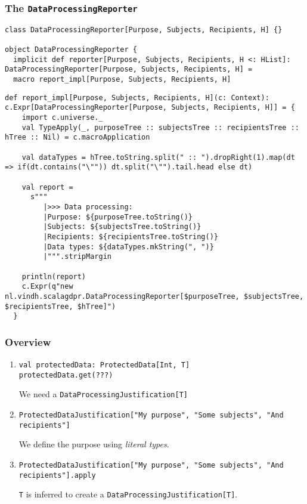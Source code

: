 \documentclass[aspectratio=169]{beamer}
\begin{document}
\begin{frame}[fragile]
\frametitle{The \texttt{DataProcessingReporter}}

\begin{lstlisting}[style=myScalastyle,frame=none]
class DataProcessingReporter[Purpose, Subjects, Recipients, H] {}

object DataProcessingReporter {
  implicit def reporter[Purpose, Subjects, Recipients, H <: HList]: DataProcessingReporter[Purpose, Subjects, Recipients, H] =
  macro report_impl[Purpose, Subjects, Recipients, H]
\end{lstlisting}
\pause
\begin{lstlisting}[style=myScalastyle,frame=none]
  def report_impl[Purpose, Subjects, Recipients, H](c: Context): c.Expr[DataProcessingReporter[Purpose, Subjects, Recipients, H]] = {
    import c.universe._
    val TypeApply(_, purposeTree :: subjectsTree :: recipientsTree :: hTree :: Nil) = c.macroApplication

    val dataTypes = hTree.toString.split(" :: ").dropRight(1).map(dt => if(dt.contains("\"")) dt.split("\"").tail.head else dt)

    val report =
      s"""
         |>>> Data processing:
         |Purpose: ${purposeTree.toString()}
         |Subjects: ${subjectsTree.toString()}
         |Recipients: ${recipientsTree.toString()}
         |Data types: ${dataTypes.mkString(", ")}
         |""".stripMargin

    println(report)
    c.Expr(q"new nl.vindh.scalagdpr.DataProcessingReporter[$purposeTree, $subjectsTree, $recipientsTree, $hTree]")
  }
\end{lstlisting}

\end{frame}


\begin{frame}[fragile]
\frametitle{Overview}

\begin{enumerate}
\item
\begin{lstlisting}[style=myScalastyle,frame=none]
val protectedData: ProtectedData[Int, T]
protectedData.get(???)
\end{lstlisting}
We need a \footnotesize{\texttt{DataProcessingJustification[T]}}
\pause
\item
\begin{lstlisting}[style=myScalastyle,frame=none]
ProtectedDataJustification["My purpose", "Some subjects", "And recipients"]
\end{lstlisting}
We define the purpose using \textit{literal types}.
\pause
\item
\begin{lstlisting}[style=myScalastyle,frame=none]
ProtectedDataJustification["My purpose", "Some subjects", "And recipients"].apply
\end{lstlisting}
\footnotesize{\texttt{T}} is inferred to create a \footnotesize{\texttt{DataProcessingJustification[T]}}.
\end{enumerate}

\end{frame}
\end{document}
